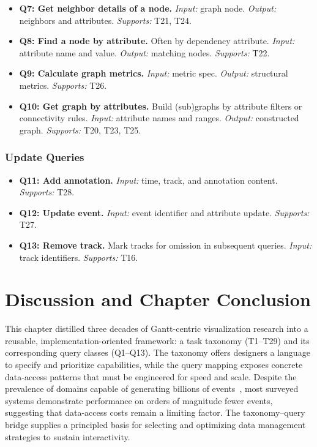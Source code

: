 \begin{refsection}
\begin{itemize}\itemsep0.25ex
\item \textbf{Q7: Get neighbor details of a node.} \emph{Input:} graph node. \emph{Output:} neighbors and attributes. \emph{Supports:} T21, T24.

\item \textbf{Q8: Find a node by attribute.} Often by dependency attribute. \emph{Input:} attribute name and value. \emph{Output:} matching nodes. \emph{Supports:} T22.

\item \textbf{Q9: Calculate graph metrics.} \emph{Input:} metric spec. \emph{Output:} structural metrics. \emph{Supports:} T26. 

\item \textbf{Q10: Get graph by attributes.} Build (sub)graphs by attribute filters or connectivity rules. \emph{Input:} attribute names and ranges. \emph{Output:} constructed graph. \emph{Supports:} T20, T23, T25.
\end{itemize}

\subsubsection{Update Queries}

\begin{itemize}\itemsep0.25ex
\item \textbf{Q11: Add annotation.} \emph{Input:} time, track, and annotation content. \emph{Supports:} T28. 

\item \textbf{Q12: Update event.} \emph{Input:} event identifier and attribute update. \emph{Supports:} T27.

\item \textbf{Q13: Remove track.} Mark tracks for omission in subsequent queries. \emph{Input:} track identifiers. \emph{Supports:} T16.
\end{itemize}

\section{Discussion and Chapter Conclusion}
\label{sec:conclusion}
This chapter distilled three decades of Gantt-centric visualization research into a reusable, implementation-oriented framework: a task taxonomy (T1--T29) and its corresponding query classes (Q1--Q13). The taxonomy offers designers a language to specify and prioritize capabilities, while the query mapping exposes concrete data-access patterns that must be engineered for speed and scale. Despite the prevalence of domains capable of generating billions of events~\cite{isaacs2014state}, most surveyed systems demonstrate performance on orders of magnitude fewer events, suggesting that data-access costs remain a limiting factor. The taxonomy--query bridge supplies a principled basis for selecting and optimizing data management strategies to sustain interactivity.


\end{refsection}
